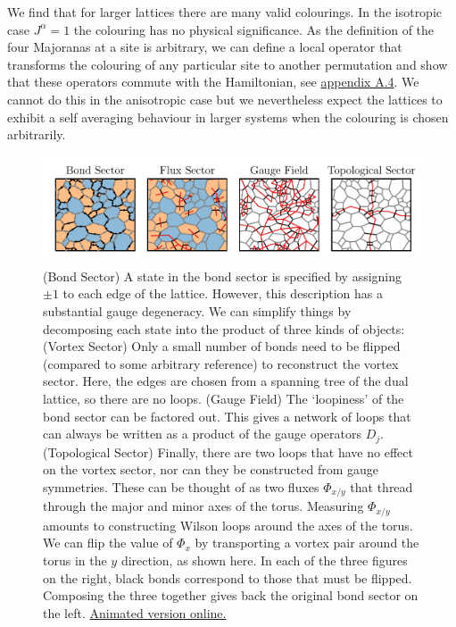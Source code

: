 We find that for larger lattices there are many valid colourings. In the isotropic case \(J^\alpha = 1\) the colouring has no physical significance. As the definition of the four Majoranas at a site is arbitrary, we can define a local operator that transforms the colouring of any particular site to another permutation and show that these operators commute with the Hamiltonian, see \protect\hyperlink{lattice-colouring}{appendix A.4}. We cannot do this in the anisotropic case but we nevertheless expect the lattices to exhibit a self averaging behaviour in larger systems when the colouring is chosen arbitrarily.

\hypertarget{fig:state_decomposition_animated}{%
\begin{figure}
\centering
\includegraphics[width=1\textwidth,height=\textheight]{figure_code/amk_chapter/intro/state_decomposition_animated/state_decomposition_animated}
\caption[{State Decomposition}]{(Bond Sector) A state in the bond sector is specified by assigning \(\pm 1\) to each edge of the lattice. However, this description has a substantial gauge degeneracy. We can simplify things by decomposing each state into the product of three kinds of objects: (Vortex Sector) Only a small number of bonds need to be flipped (compared to some arbitrary reference) to reconstruct the vortex sector. Here, the edges are chosen from a spanning tree of the dual lattice, so there are no loops. (Gauge Field) The `loopiness' of the bond sector can be factored out. This gives a network of loops that can always be written as a product of the gauge operators \(D_j\). (Topological Sector) Finally, there are two loops that have no effect on the vortex sector, nor can they be constructed from gauge symmetries. These can be thought of as two fluxes \(\Phi_{x/y}\) that thread through the major and minor axes of the torus. Measuring \(\Phi_{x/y}\) amounts to constructing Wilson loops around the axes of the torus. We can flip the value of \(\Phi_{x}\) by transporting a vortex pair around the torus in the \(y\) direction, as shown here. In each of the three figures on the right, black bonds correspond to those that must be flipped. Composing the three together gives back the original bond sector on the left. \href{http://thomashodson.com/assets/thesis/amk_chapter/intro/state_decomposition_animated/state_decomposition_animated.gif}{ Animated version online.}}
\label{fig:state_decomposition_animated}
\end{figure}
}

